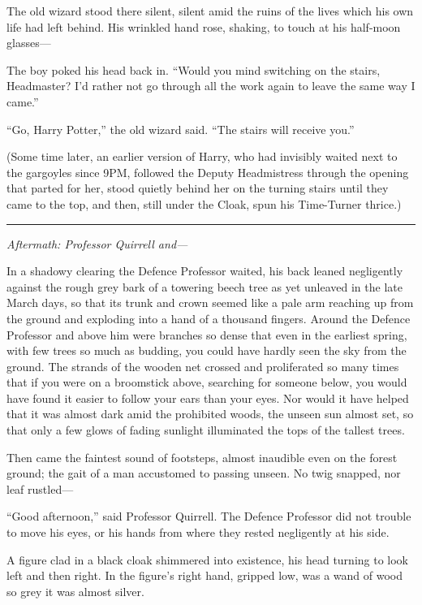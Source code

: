 The old wizard stood there silent, silent amid the ruins of the lives
which his own life had left behind. His wrinkled hand rose, shaking, to
touch at his half-moon glasses---

The boy poked his head back in. ``Would you mind switching on the
stairs, Headmaster? I'd rather not go through all the work again to
leave the same way I came.''

``Go, Harry Potter,'' the old wizard said. ``The stairs will receive
you.''

(Some time later, an earlier version of Harry, who had invisibly waited
next to the gargoyles since 9PM, followed the Deputy Headmistress
through the opening that parted for her, stood quietly behind her on the
turning stairs until they came to the top, and then, still under the
Cloak, spun his Time-Turner thrice.)

\begin{center}\rule{3in}{0.4pt}\end{center}

\emph{Aftermath: Professor Quirrell and---}

In a shadowy clearing the Defence Professor waited, his back leaned
negligently against the rough grey bark of a towering beech tree as yet
unleaved in the late March days, so that its trunk and crown seemed like
a pale arm reaching up from the ground and exploding into a hand of a
thousand fingers. Around the Defence Professor and above him were
branches so dense that even in the earliest spring, with few trees so
much as budding, you could have hardly seen the sky from the ground. The
strands of the wooden net crossed and proliferated so many times that if
you were on a broomstick above, searching for someone below, you would
have found it easier to follow your ears than your eyes. Nor would it
have helped that it was almost dark amid the prohibited woods, the
unseen sun almost set, so that only a few glows of fading sunlight
illuminated the tops of the tallest trees.

Then came the faintest sound of footsteps, almost inaudible even on the
forest ground; the gait of a man accustomed to passing unseen. No twig
snapped, nor leaf rustled---

``Good afternoon,'' said Professor Quirrell. The Defence Professor did
not trouble to move his eyes, or his hands from where they rested
negligently at his side.

A figure clad in a black cloak shimmered into existence, his head
turning to look left and then right. In the figure's right hand, gripped
low, was a wand of wood so grey it was almost silver.

